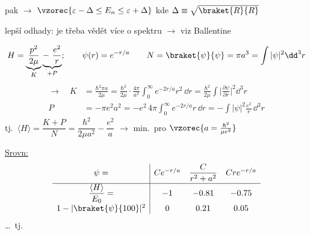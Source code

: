 pak \quad $\to$ \quad $\vzorec{\varepsilon - \Delta \leq E_n \leq \varepsilon + \Delta}$ \quad kde \quad $\Delta \equiv \sqrt{\braket{R}{R}}$

lepší odhady: je třeba vědět více o spektru $\to$ viz Ballentine

\begin{priklad}
\[
  H = \underbrace{\frac{p^2}{2\mu}}_{K} \underbrace{-\ \frac{e^2}{r}}_{+P}; \qquad
  \psi(r) = e^{-r/a} \qquad N = \braket{\psi}{\psi} = \pi a^3 = \int|\psi|^2\dd^3r
\]
\begin{align*}
  \to\quad K &= \frac{\hbar^2\pi a}{2\mu}
     = \frac{\hbar^2}{2\mu}\cdot\frac{4\pi}{a^2}\int_0^\infty e^{-2r/a}r^2\,\dd r
     = \frac{\hbar^2}{2\mu}\int\Big|\frac{\partial\psi}{\partial r}\Big|^2\dd^3r \\
  P &= -\pi e^2a^2 = -e^2\,4\pi\int_0^\infty e^{-2r/a}r\,\dd r = -\int|\psi|^2\frac{e^2}{r}\,\dd^3r
\end{align*}
tj.\ \quad $\langle H\rangle = \dfrac{K + P}{N} = \dfrac{\hbar^2}{2\mu a^2} - \dfrac{e^2}{a}$
\quad $\to$ \quad min.\ pro \quad $\vzorec{a = \frac{\hbar^2}{\mu e^2}}$

\underline{Srovn:}
\[
  \begin{array}{c|ccc}
    \psi = & Ce^{-r/a} & \dfrac{C}{r^2 + a^2} & Cre^{-r/a} \\[6pt] \hline
    \rule{0pt}{14pt}\dfrac{\langle H\rangle}{E_0} = & -1 & -0.81 & -0.75 \\[6pt]
    1 - |\braket{\psi}{100}|^2 & 0 & 0.21 & 0.05
  \end{array}
\]
\dots\ tj.\ 
\end{priklad}
